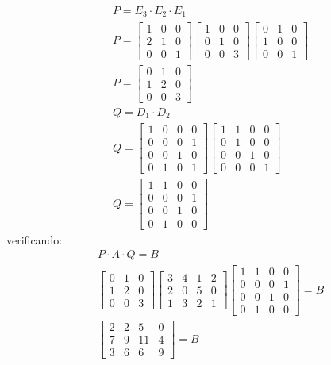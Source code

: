 	\begin{align*}
		&P=E_3\cdot E_2\cdot E_1 \\
		&P=\begin{bmatrix}
			1&0&0\\
			2&1&0\\
			0&0&1
		\end{bmatrix}\begin{bmatrix}
			1&0&0\\
			0&1&0\\
			0&0&3
		\end{bmatrix}\begin{bmatrix}
			0&1&0\\
			1&0&0\\
			0&0&1
		\end{bmatrix}\\
		&P= \begin{bmatrix}
			0&1&0\\
			1&2&0\\
			0&0&3
		\end{bmatrix}\\
		&Q=D_1\cdot D_2 \\
		&Q=\begin{bmatrix}
			1&0&0&0\\
			0&0&0&1\\
			0&0&1&0\\
			0&1&0&1
		\end{bmatrix}\begin{bmatrix}
			1&1&0&0\\
			0&1&0&0\\
			0&0&1&0\\
			0&0&0&1
		\end{bmatrix} \\
		&Q= \begin{bmatrix}
			1&1&0&0\\
			0&0&0&1\\
			0&0&1&0\\
			0&1&0&0
		\end{bmatrix}
	\end{align*}
	verificando:
	\begin{align*}
		&P\cdot A\cdot Q = B\\
		&\begin{bmatrix}
			0&1&0\\
			1&2&0\\
			0&0&3
		\end{bmatrix}\begin{bmatrix}
			3&4&1&2\\
			2&0&5&0\\
			1&3&2&1
		\end{bmatrix}\begin{bmatrix}
			1&1&0&0\\
			0&0&0&1\\
			0&0&1&0\\
			0&1&0&0
		\end{bmatrix}=B\\
		&\begin{bmatrix}
			2&2&5&0\\
			7&9&11&4\\
			3&6&6&9
		\end{bmatrix}=B
	\end{align*}
